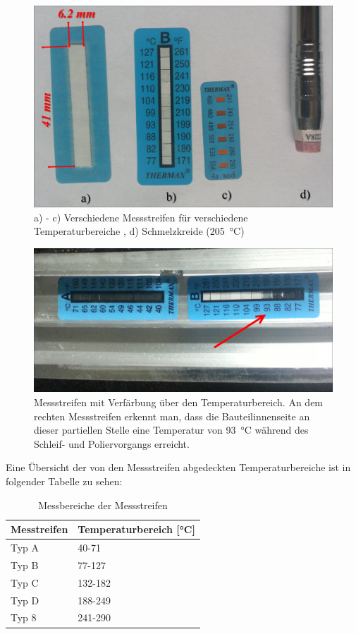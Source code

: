 \documentclass[12pt,a4paper,parskip,twoside,BCOR5mm,headsepline]{scrartcl}
\begin{document}
\begin{figure}[H]
\centering
\includegraphics[width=.8\textwidth]{messstreifen}
\caption{a) - c) Verschiedene Messstreifen für verschiedene Temperaturbereiche , d) Schmelzkreide (\SI{205}{\degreeCelsius}) }
\label{fig:messstreifen}
\end{figure}
\begin{figure}[H]
\centering
\includegraphics[width=.8\textwidth]{messaction}
\caption{Messstreifen mit Verfärbung über den Temperaturbereich. An dem rechten Messstreifen erkennt man, dass die Bauteilinnenseite an dieser partiellen Stelle eine Temperatur von \SI{93}{\degreeCelsius} während des Schleif- und Poliervorgangs erreicht. }
\label{fig:messaction}
\end{figure}

Eine Übersicht der von den  Messstreifen abgedeckten Temperaturbereiche ist in folgender Tabelle zu sehen:

\begin{table}[H]
\caption{Messbereiche der Messstreifen}
\label{tab:messbereiche}
\centering
\begin{tabular}{ll}
\toprule
Messtreifen  & Temperaturbereich [\si{\degreeCelsius}]\\
\midrule
Typ A & 40-71\\
Typ B & 77-127\\
Typ C & 132-182\\
Typ D & 188-249\\
Typ 8 & 241-290\\
\bottomrule
\end{tabular}
\end{table}
\end{document}
